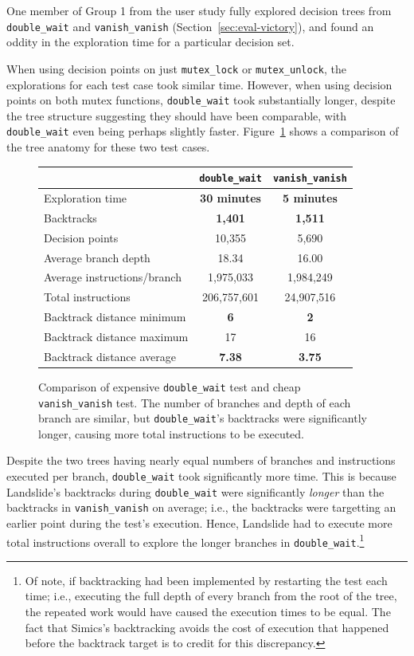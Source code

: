 One member of Group 1 from the user study fully explored decision trees from \texttt{double\_wait} and \texttt{vanish\_vanish} (Section~\ref{sec:eval-victory}), and found an oddity in the exploration time for a particular decision set.

When using decision points on just \texttt{mutex\_lock} or \texttt{mutex\_unlock}, the explorations for each test case took similar time. However, when using decision points on both mutex functions, \texttt{double\_wait} took substantially longer, despite the tree structure suggesting they should have been comparable, with \texttt{double\_wait} even being perhaps slightly faster. Figure~\ref{fig:nadim-stats} shows a comparison of the tree anatomy for these two test cases.

\begin{figure}[h]
	\small
	\centering
	\begin{tabular}{|l||c|c|}
		\hline
		& \texttt{double\_wait} & \texttt{vanish\_vanish} \\
		\hline\hline
		Exploration time & {\bf 30 minutes} & {\bf 5 minutes} \\
		\hline
		Backtracks & {\bf 1,401} & {\bf 1,511} \\
		\hline
		Decision points & 10,355 & 5,690 \\
		\hline
		Average branch depth & 18.34 & 16.00 \\
		\hline
		Average instructions/branch& 1,975,033 & 1,984,249 \\
		\hline
		Total instructions & 206,757,601 & 24,907,516 \\
		\hline
		Backtrack distance minimum & {\bf 6} & {\bf 2} \\
		\hline
		Backtrack distance maximum & 17 & 16 \\
		\hline
		Backtrack distance average & {\bf 7.38}  & {\bf 3.75} \\
		\hline
	\end{tabular}
	\caption{Comparison of expensive \texttt{double\_wait} test and cheap \texttt{vanish\_vanish} test. The number of branches and depth of each branch are similar, but \texttt{double\_wait}'s backtracks were significantly longer, causing more total instructions to be executed.}
	\label{fig:nadim-stats}
\end{figure}

Despite the two trees having nearly equal numbers of branches and instructions executed per branch, \texttt{double\_wait} took significantly more time. This is because Landslide's backtracks during \texttt{double\_wait} were significantly {\em longer} than the backtracks in \texttt{vanish\_vanish} on average; i.e., the backtracks were targetting an earlier point during the test's execution.
Hence, Landslide had to execute more total instructions overall to explore the longer branches in \texttt{double\_wait}.\footnote{
Of note, if backtracking had been implemented by restarting the test each time; i.e., executing the full depth of every branch from the root of the tree, the repeated work would have caused the execution times to be equal. The fact that Simics's backtracking avoids the cost of execution that happened before the backtrack target is to credit for this discrepancy.}

